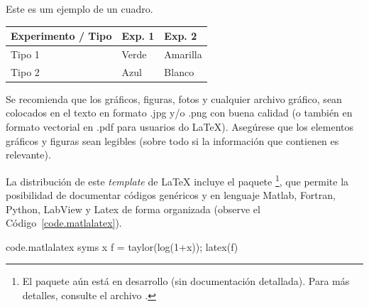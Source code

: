 \documentclass[12pt, a4paper, twoside, twocolumn]{article}
\begin{document}
\begin{quadro}[ht!]
  \centering {} \setlength\aboverulesep{0pt} \setlength\belowrulesep{0pt}
  \caption{Este es um ejemplo de un cuadro.}
	\fontsize{11}{12}\selectfont 
    \begin{tabular}{| C{2.8cm} | C{1.8cm} | C{1.8cm} |}
    \hline
    \textbf{ Experimento / Tipo } & \textbf{Exp. 1} & \textbf{Exp. 2}\\
	\midrule
		Tipo 1& Verde & Amarilla\\
		 Tipo 2 & Azul & Blanco\\
		\hline
    \end{tabular}
    \label{quad.exemplo}%
\end{quadro}%



Se recomienda que los gráficos, figuras, fotos y cualquier archivo gráfico, sean colocados en el texto en formato .jpg y/o .png con buena calidad (o también en formato vectorial en .pdf para usuarios do \LaTeX\xspace). Asegúrese que los elementos gráficos y figuras sean legibles (sobre todo si la información que contienen es relevante).

La distribución de este \textit{template} de \LaTeX\xspace incluye el paquete \footnote{El paquete aún está en desarrollo (sin documentación detallada). Para más detalles, consulte el archivo .}, que permite la posibilidad de documentar códigos genéricos y en lenguaje Matlab, Fortran, Python, LabView y Latex de forma organizada (observe el Código~\ref{code.matlalatex}).

\begin{matlabcode}{code.matlalatex}
  syms x
  f = taylor(log(1+x));
  latex(f)
\end{matlabcode}
\end{document}
